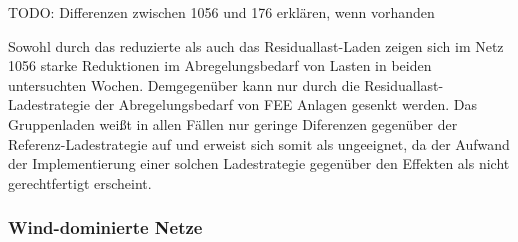 {\color{red} TODO: Differenzen zwischen 1056 und 176 erklären, wenn vorhanden}

Sowohl durch das reduzierte als auch das Residuallast-Laden zeigen sich im Netz \num{1056} starke Reduktionen im Abregelungsbedarf von Lasten in beiden untersuchten Wochen.
Demgegenüber kann nur durch die Residuallast-Ladestrategie der Abregelungsbedarf von \gls{FEE} Anlagen gesenkt werden.
Das Gruppenladen weißt in allen Fällen nur geringe Diferenzen gegenüber der Referenz-Ladestrategie auf und erweist sich somit als ungeeignet, da der Aufwand der Implementierung einer solchen Ladestrategie gegenüber den Effekten als nicht gerechtfertigt erscheint.


\subsubsection{Wind-dominierte Netze}




\clearpage
